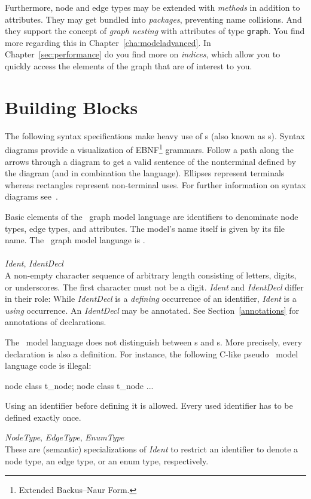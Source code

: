 Furthermore, node and edge types may be extended with \emph{methods} in addition to attributes.
They may get bundled into \emph{packages}, preventing name collisions.
And they support the concept of \emph{graph nesting} with attributes of type \texttt{graph}.
You find more regarding this in Chapter~\ref{cha:modeladvanced}.
In Chapter~\ref{sec:performance} do you find more on \emph{indices}, which allow you to quickly access the elements of the graph that are of interest to you.

\section{Building Blocks}
\label{modelbb}

\begin{note}
The following syntax specifications make heavy use of s (also known as s).
Syntax diagrams provide a visualization of EBNF\footnote{Extended Backus–Naur Form.} grammars.
Follow a path along the arrows through a diagram to get a valid sentence of the nonterminal defined by the diagram (and in combination the language).
Ellipses represent terminals whereas rectangles represent non-terminal uses.
For further information on syntax diagrams see~\cite{MMJW:91}.
\end{note}
Basic elements of the \GrG\ graph model language are identifiers to denominate node types, edge types, and attributes.
The model's name itself is given by its file name.
The \GrG\ graph model language is .\\
\\
\emph{Ident}, \emph{IdentDecl}\\ \nopagebreak
A non-empty character sequence of arbitrary length consisting of letters, digits, or underscores.
The first character must not be a digit. \emph{Ident} and \emph{IdentDecl} differ in their role:
While \emph{IdentDecl} is a \emph{defining} occurrence of an identifier, \emph{Ident} is a \emph{using} occurrence.
An \emph{IdentDecl} may be annotated. See Section~\ref{annotations} for annotations of declarations.
\begin{note}
\label{note:modeldecl}
  The \GrG\ model language does not distinguish between s and s. More precisely, every declaration is also a definition. For instance, the following C-like pseudo \GrG\ model language code is illegal:
\begin{grgen}
node class t_node;
node class t_node {
  ...
}
\end{grgen}
Using an identifier before defining it is allowed. Every used identifier has to be defined exactly once.
\end{note}
\emph{NodeType}, \emph{EdgeType}, \emph{EnumType}\\ %
These are (semantic) specializations of \emph{Ident} to restrict an identifier to denote a node type, an edge type, or an enum type, respectively.

